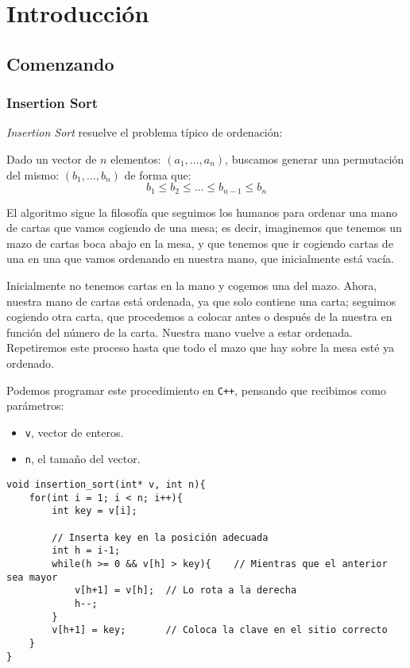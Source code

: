 \chapter{Introducción}
\section{Comenzando}
\subsection{Insertion Sort}

\noindent
\textit{Insertion Sort} resuelve el problema típico de ordenación:
\begin{center}
    Dado un vector de $n$ elementos: $(a_1, \ldots, a_n)$, buscamos generar una permutación del mismo: $(b_1, \ldots, b_n)$ de forma que:
    \begin{equation*}
        b_1 \leq b_2 \leq \ldots \leq b_{n-1} \leq b_n
    \end{equation*}
\end{center}

El algoritmo sigue la filosofía que seguimos los humanos para ordenar una mano de cartas que vamos cogiendo de una mesa; es decir, imaginemos que tenemos un mazo de cartas boca abajo en la mesa, y que tenemos que ir cogiendo cartas de una en una que vamos ordenando en nuestra mano, que inicialmente está vacía.

Inicialmente no tenemos cartas en la mano y cogemos una del mazo. Ahora, nuestra mano de cartas está ordenada, ya que solo contiene una carta; seguimos cogiendo otra carta, que procedemos a colocar antes o después de la nuestra en función del número de la carta. Nuestra mano vuelve a estar ordenada. Repetiremos este proceso hasta que todo el mazo que hay sobre la mesa esté ya ordenado.

Podemos programar este procedimiento en \texttt{C++}, pensando que recibimos como parámetros:
\begin{itemize}
    \item \texttt{v}, vector de enteros.
    \item \texttt{n}, el tamaño del vector.
\end{itemize}

\begin{verbatim}
void insertion_sort(int* v, int n){
    for(int i = 1; i < n; i++){
        int key = v[i];

        // Inserta key en la posición adecuada
        int h = i-1;
        while(h >= 0 && v[h] > key){    // Mientras que el anterior sea mayor
            v[h+1] = v[h];  // Lo rota a la derecha
            h--;
        }
        v[h+1] = key;       // Coloca la clave en el sitio correcto
    }
}
\end{verbatim}

